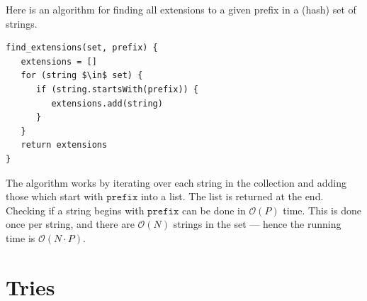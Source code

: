 \documentclass[a4paper,12pt]{article}
\newcommand{\kwa}[1]{\mathtt{#1}}
\begin{document}
\noindent
Here is an algorithm for finding all extensions to a given prefix in a (hash) set of strings.

\begin{lstlisting}
find_extensions(set, prefix) {
   extensions = []
   for (string $\in$ set) {
      if (string.startsWith(prefix)) {
         extensions.add(string)
      }
   }
   return extensions
}
\end{lstlisting}

\noindent
The algorithm works by iterating over each string in the collection and adding those which start with $\kwa{prefix}$ into a list. The list is returned at the end. Checking if a string begins with $\kwa{prefix}$ can be done in $\mathcal{O}(P)$ time. This is done once per string, and there are $\mathcal{O}(N)$ strings in the set --- hence the running time is $\mathcal{O}(N \cdot P)$.

\section{Tries}
\end{document}
